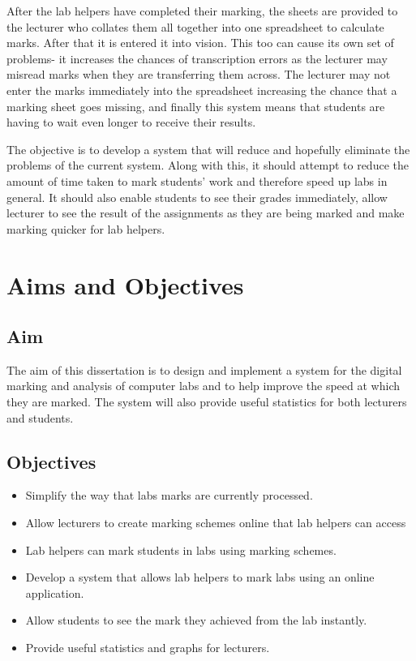 \documentclass[12pt]{article}  %
\begin{document}
After the lab helpers have completed their marking, the sheets are provided to the lecturer who collates them all together into one spreadsheet to calculate marks. After that it is entered it into vision. This too can cause its own set of problems- it increases the chances of transcription errors as the lecturer may misread marks when they are transferring them across. The lecturer may not enter the marks immediately into the spreadsheet increasing the chance that a marking sheet goes missing, and finally this system means that students are having to wait even longer to receive their results.


The objective is to develop a system that will reduce and hopefully eliminate the problems of the current system. Along with this, it should attempt to reduce the amount of time taken to mark students’ work and therefore speed up labs in general. It should also enable students to see their grades immediately, allow lecturer to see the result of the assignments as they are being marked and make marking quicker for lab helpers.


\newpage
\section{Aims and Objectives}
\subsection{Aim}
The aim of this dissertation is to design and implement a system for the digital marking and analysis of computer labs and to help improve the speed at which they are marked. The system will also provide useful statistics for both lecturers and students.


\subsection{Objectives}
\label{section:object}
\begin{itemize}
\item Simplify the way that labs marks are currently processed.
\item Allow lecturers to create marking schemes online that lab helpers can access
\item Lab helpers can mark students in labs using marking schemes.
\item Develop a system that allows lab helpers to mark labs using an online application.
\item Allow students to see the mark they achieved from the lab instantly.
\item Provide useful statistics and graphs for lecturers.
\end{itemize}
\end{document}
